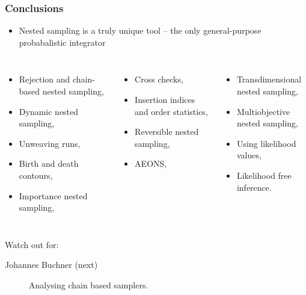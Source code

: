 \documentclass[aspectratio=169]{beamer}
\begin{document}
\begin{frame}
    \frametitle{Conclusions}
    \vspace{-8pt}
    \begin{itemize}
        \item Nested sampling is a truly unique tool -- the only general-purpose probabalistic integrator
    \end{itemize}
    \vspace{-18pt}
    \begin{columns}[t]
        \small
        \hspace{10pt}
        \begin{itemize}
            \itemsep0em
            \item Rejection and chain-based nested sampling,
            \item Dynamic nested sampling,
            \item Unweaving runs,
            \item Birth and death contours,
            \item Importance nested sampling,
        \end{itemize}
        \begin{itemize}
            \itemsep0em
            \item Cross checks,
            \item Insertion indices and order statistics,
            \item Reversible nested sampling,
            \item AEONS,
        \end{itemize}
        \begin{itemize}
            \itemsep0em
            \item Transdimensional nested sampling,
            \item Multiobjective nested sampling,
            \item Using likelihood values,
            \item Likelihood free inference.
        \end{itemize}
    \end{columns}
    \begin{block}{Watch out for:}
        \vspace{-5pt}
        \begin{description}
            \item[Johannes Buchner (next)] Analysing chain based samplers.

\end{description}
\end{block}
\end{frame}
\end{document}
